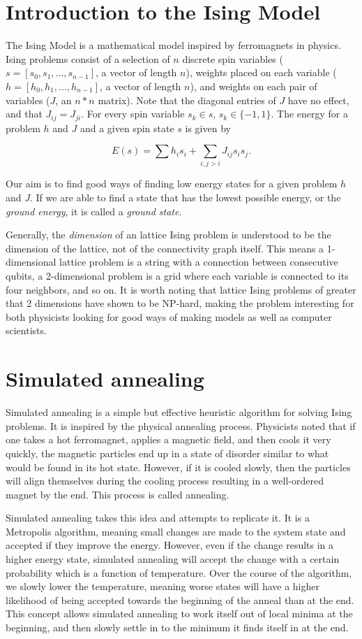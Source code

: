 \documentclass[11pt]{report}
\newcommand{\?}{\stackrel{?}{=}}
\begin{document}
\section{Introduction to the Ising Model}
The Ising Model is a mathematical model inspired by ferromagnets in physics. Ising problems consist of a selection of $n$ discrete spin variables ($s = [s_0, s_1, ..., s_{n-1}]$, a vector of length $n$), weights placed on each variable ($h = [h_0, h_1, ..., h_{n-1}]$, a vector of length $n$), and weights on each pair of variables ($J$, an $n*n$ matrix). Note that the diagonal entries of $J$ have no effect, and that $J_{ij}=J_{ji}$. For every spin variable $s_k \in s$, $s_k \in \{-1,1\}$. The energy for a problem $h$ and $J$ and a given spin state $s$ is given by

$$E(s) = \sum h_is_i + \sum_{i,j>i}J_{ij}s_is_j.$$

Our aim is to find good ways of finding low energy states for a given problem $h$ and $J$. If we are able to find a state that has the lowest possible energy, or the \textit{ground energy}, it is called a \textit{ground state}.

Generally, the \textit{dimension} of an lattice Ising problem is understood to be the dimension of the lattice, not of the connectivity graph itself. This means a 1-dimensional lattice problem is a string with a connection between consecutive qubits, a 2-dimensional problem is a grid where each variable is connected to its four neighbors, and so on. It is worth noting that lattice Ising problems of greater that 2 dimensions have shown to be NP-hard, making the problem interesting for both physicists looking for good ways of making models as well as computer scientists.

\section{Simulated annealing}
Simulated annealing is a simple but effective heuristic algorithm for solving Ising problems. It is inspired by the physical annealing process. Physicists noted that if one takes a hot ferromagnet, applies a magnetic field, and then cools it very quickly, the magnetic particles end up in a state of disorder similar to what would be found in its hot state. However, if it is cooled slowly, then the particles will align themselves during the cooling process resulting in a well-ordered magnet by the end. This process is called annealing.

Simulated annealing takes this idea and attempts to replicate it. It is a Metropolis algorithm, meaning small changes are made to the system state and accepted if they improve the energy. However, even if the change results in a higher energy state, simulated annealing will accept the change with a certain probability which is a function of temperature. Over the course of the algorithm, we slowly lower the temperature, meaning worse states will have a higher likelihood of being accepted towards the beginning of the anneal than at the end. This concept allows simulated annealing to work itself out of local minima at the beginning, and then slowly settle in to the minimum it finds itself in at the end.
\end{document}
